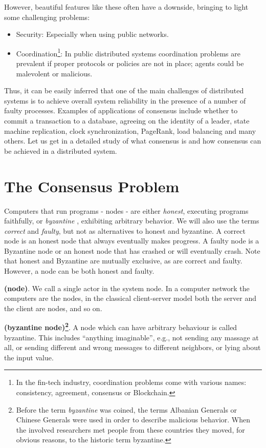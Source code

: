 \bigskip
\noindent
However, beautiful features like these often have a downside, bringing to light some challenging problems:
\begin{itemize}
    \item Security: Especially when using public networks.
    \item Coordination\footnote{In the fin-tech industry, coordination problems come with various names: consistency, agreement, consensus or Blockchain.}: In public distributed systems coordination problems are prevalent if proper protocols or policies are not in place; agents could be malevolent or malicious.
\end{itemize}
Thus, it can be easily inferred that one of the main challenges of distributed systems is to achieve overall system reliability in the presence of a number of faulty processes. Examples of applications of consensus include whether to commit a transaction to a database, agreeing on the identity of a leader, state machine replication, clock synchronization, PageRank, load balancing and many others. Let us get in a detailed study of what consensus is and how consensus can be achieved in a distributed system.

\bigskip
\section{The Consensus Problem}
Computers that run programs - nodes - are either \textit{honest}, executing programs faithfully, or \textit{byzantine} \cite{Lamport:1982:BGP:357172.357176}, exhibiting arbitrary behavior. We will also use the terms \textit{correct} and \textit{faulty}, but not as alternatives to honest and byzantine. A correct node is an honest node that always eventually makes progress. A faulty node is a Byzantine node or an honest node that has crashed or will eventually crash. Note that honest and Byzantine
are mutually exclusive, as are correct and faulty. However, a node can be both honest and faulty.
\begin{mydef} {\bf (node)}.
    We call a single actor in the system node. In a computer network the computers are the nodes, in the classical client-server model both the server and the client are nodes, and so on.
\end{mydef}
\begin{mydef} {\bf (byzantine node)\footnote{Before the term \textit{byzantine} was coined, the terms Albanian Generals or Chinese Generals were used in order to describe malicious behavior. When the involved researchers met people from these countries they moved, for obvious reasons, to the historic term byzantine.}}.
    A node which can have arbitrary behaviour is called byzantine. This includes \enquote{anything imaginable}, e.g., not sending any massage at all, or sending different and wrong messages to different neighbors, or lying about the input value.
\end{mydef}


